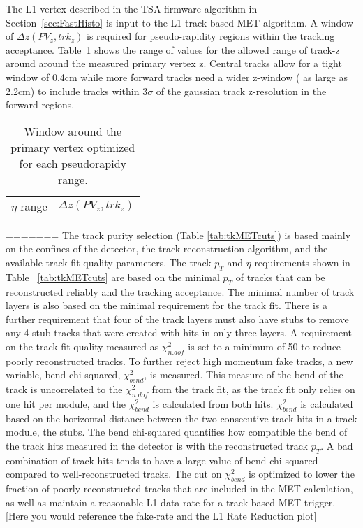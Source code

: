 The L1 vertex described in the TSA firmware algorithm in Section~\ref{sec:FastHisto} is input to the L1 track-based MET algorithm. A window of $\Delta z\left(PV_{z}, trk_{z}\right)$ is required for pseudo-rapidity regions within the tracking acceptance. Table~\ref{tab:zwindows} shows the range of values for the allowed range of track-z around around the measured primary vertex z. Central tracks allow for a tight window of 0.4cm while more forward tracks need a wider z-window ( as large as 2.2cm) to include tracks within $3\sigma$ of the gaussian track z-resolution in the forward regions.
\begin{table}[h]
\begin{tabular}{|c|c|}
$\eta$ range & $\Delta z\left(PV_{z}, trk_{z}\right)$\\
\end{tabular}

\caption{Window around the primary vertex optimized for each pseudorapidy range. }
\label{tab:zwindows}
\end{table}
=======
The track purity selection (Table \ref{tab:tkMETcuts}) is based mainly on the confines of the detector, the track reconstruction algorithm, and the available track fit quality parameters. The track $p_{T}$ and $\eta$ requirements shown in Table ~\ref{tab:tkMETcuts} are based on the minimal $p_{T}$ of tracks that can be reconstructed reliably and the tracking acceptance. The minimal number of track layers is also based on the minimal requirement for the track fit. There is a further requirement that four of the track layers must also have stubs to remove any 4-stub tracks that were created with hits in only three layers. A requirement on the track fit quality measured as $\chi^{2}_{n.dof}$ is set to a minimum of 50 to reduce poorly reconstructed tracks. To further reject high momentum fake tracks, a new variable, bend chi-squared, $\chi^{2}_{bend}$, is measured. This measure of the bend of the track is uncorrelated to the $\chi^{2}_{n.dof}$ from the track fit, as the track fit only relies on one hit per module, and the $\chi^{2}_{bend}$ is calculated from both hits. $\chi^{2}_{bend}$ is calculated based on the horizontal distance between the two consecutive track hits in a track module, the stubs. The bend chi-squared quantifies how compatible the bend of the track hits measured in the detector is with the reconstructed track $p_{T}$. A bad combination of track hits tends to have a large value of bend chi-squared compared to well-reconstructed tracks. The cut on $\chi^{2}_{bend}$ is optimized to lower the fraction of poorly reconstructed tracks that are included in the MET calculation, as well as maintain a reasonable L1 data-rate for a track-based MET trigger. [Here you would reference the fake-rate and the L1 Rate Reduction plot]

